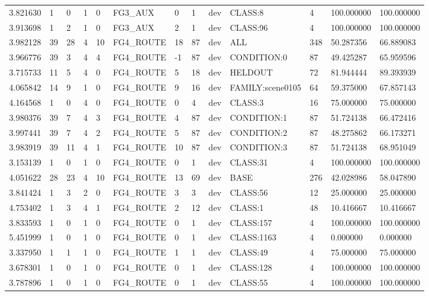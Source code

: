 \begin{tabular}{lllllllllllll}
3.821630 & 1 & 0 & 1 & 0 & FG3\_AUX & 0 & 1 & dev & CLASS:8 & 4 & 100.000000 & 100.000000 \\
3.913698 & 1 & 2 & 1 & 0 & FG3\_AUX & 2 & 1 & dev & CLASS:96 & 4 & 100.000000 & 100.000000 \\
3.982128 & 39 & 28 & 4 & 10 & FG4\_ROUTE & 18 & 87 & dev & ALL & 348 & 50.287356 & 66.889083 \\
3.966776 & 39 & 3 & 4 & 4 & FG4\_ROUTE & -1 & 87 & dev & CONDITION:0 & 87 & 49.425287 & 65.959596 \\
3.715733 & 11 & 5 & 4 & 0 & FG4\_ROUTE & 5 & 18 & dev & HELDOUT & 72 & 81.944444 & 89.393939 \\
4.065842 & 14 & 9 & 1 & 0 & FG4\_ROUTE & 9 & 16 & dev & FAMILY:scene0105 & 64 & 59.375000 & 67.857143 \\
4.164568 & 1 & 0 & 4 & 0 & FG4\_ROUTE & 0 & 4 & dev & CLASS:3 & 16 & 75.000000 & 75.000000 \\
3.980376 & 39 & 7 & 4 & 3 & FG4\_ROUTE & 4 & 87 & dev & CONDITION:1 & 87 & 51.724138 & 66.472416 \\
3.997441 & 39 & 7 & 4 & 2 & FG4\_ROUTE & 5 & 87 & dev & CONDITION:2 & 87 & 48.275862 & 66.173271 \\
3.983919 & 39 & 11 & 4 & 1 & FG4\_ROUTE & 10 & 87 & dev & CONDITION:3 & 87 & 51.724138 & 68.951049 \\
3.153139 & 1 & 0 & 1 & 0 & FG4\_ROUTE & 0 & 1 & dev & CLASS:31 & 4 & 100.000000 & 100.000000 \\
4.051622 & 28 & 23 & 4 & 10 & FG4\_ROUTE & 13 & 69 & dev & BASE & 276 & 42.028986 & 58.047890 \\
3.841424 & 1 & 3 & 2 & 0 & FG4\_ROUTE & 3 & 3 & dev & CLASS:56 & 12 & 25.000000 & 25.000000 \\
4.753402 & 1 & 3 & 4 & 1 & FG4\_ROUTE & 2 & 12 & dev & CLASS:1 & 48 & 10.416667 & 10.416667 \\
3.833593 & 1 & 0 & 1 & 0 & FG4\_ROUTE & 0 & 1 & dev & CLASS:157 & 4 & 100.000000 & 100.000000 \\
5.451999 & 1 & 0 & 1 & 0 & FG4\_ROUTE & 0 & 1 & dev & CLASS:1163 & 4 & 0.000000 & 0.000000 \\
3.337950 & 1 & 1 & 1 & 0 & FG4\_ROUTE & 1 & 1 & dev & CLASS:49 & 4 & 75.000000 & 75.000000 \\
3.678301 & 1 & 0 & 1 & 0 & FG4\_ROUTE & 0 & 1 & dev & CLASS:128 & 4 & 100.000000 & 100.000000 \\
3.787896 & 1 & 0 & 1 & 0 & FG4\_ROUTE & 0 & 1 & dev & CLASS:55 & 4 & 100.000000 & 100.000000 \\

\end{tabular}
